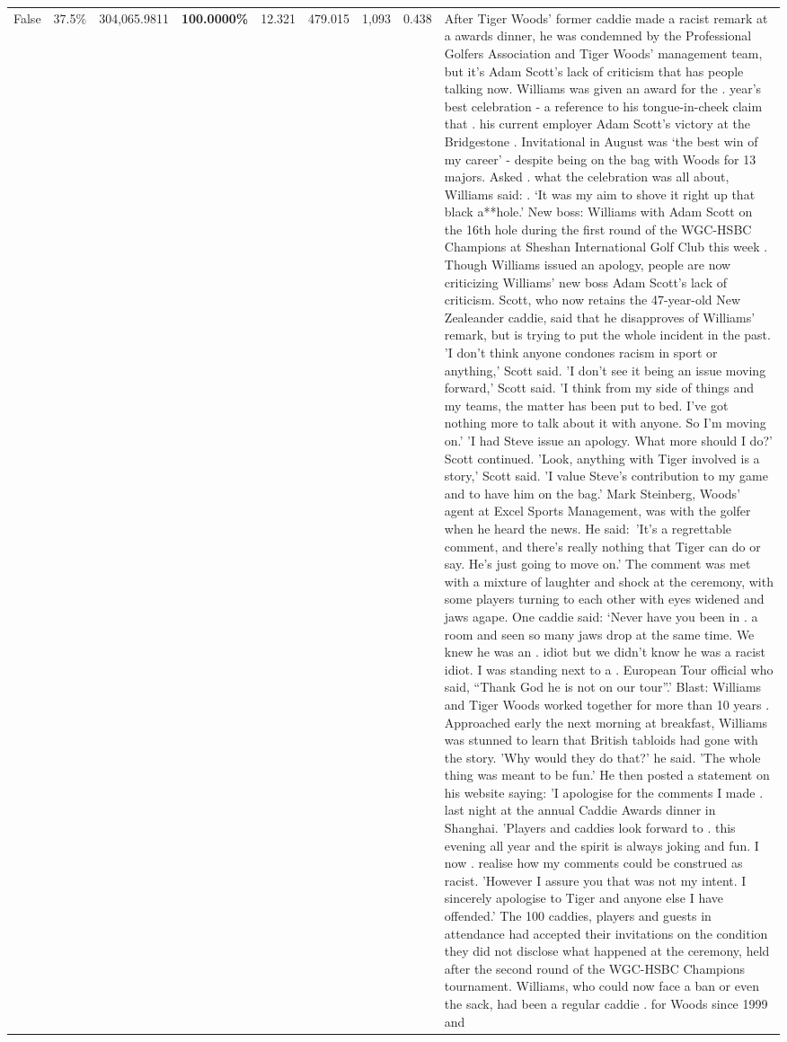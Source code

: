\begin{table}[H]
\begin{tabular}{lllrlllll}
False & 37.5\% & 304,065.9811 & \bfseries \color{red} 100.0000\% & 12.321 & 479.015 & 1,093 & 0.438 & After Tiger Woods' former caddie made a racist remark at a awards dinner, he was condemned by the Professional Golfers Association and Tiger Woods' management team, but it's Adam Scott's lack of criticism that has people talking now. Williams was given an award for the . year’s best celebration - a reference to his tongue-in-cheek claim that . his current employer Adam Scott’s victory at the Bridgestone . Invitational in August was ‘the best win of my career’ - despite being on the bag with Woods for 13 majors. Asked . what the celebration was all about, Williams said: . ‘It was my aim to shove it right up that black a**hole.’ New boss: Williams with Adam Scott  on the 16th hole during the first round of the WGC-HSBC Champions at Sheshan International Golf Club this week . Though Williams issued an apology, people are now criticizing Williams' new boss Adam Scott's lack of criticism. Scott, who now retains the 47-year-old New Zealeander caddie, said that he disapproves of Williams' remark, but is trying to put the whole incident in the past. 'I don't think anyone condones racism in sport or anything,' Scott said. 'I don't see it being an issue moving forward,' Scott said. 'I think from my side of things and my teams, the matter has been put to bed. I've got nothing more to talk about it with anyone. So I'm moving on.' 'I had Steve issue an apology. What more should I do?' Scott continued. 'Look, anything with Tiger involved is a story,' Scott said. 'I value Steve's contribution to my game and to have him on the bag.' Mark Steinberg, Woods' agent at Excel Sports Management, was with the golfer when he heard the news. He said: 'It's a regrettable comment, and there's really nothing that Tiger can do or say. He's just going to move on.' The comment was met with a mixture of laughter and shock at the ceremony, with some players turning to each other with eyes widened and jaws agape. One caddie said: ‘Never have you been in . a room and seen so many jaws drop at the same time. We knew he was an . idiot but we didn’t know he was a racist idiot. I was standing next to a . European Tour official who said, “Thank God he is not on our tour”.’ Blast: Williams and Tiger Woods worked together for more than 10 years . Approached early the next morning at breakfast, Williams was stunned to learn that British tabloids had gone with the story. 'Why would they do that?' he said. 'The whole thing was meant to be fun.' He then posted a statement on his website saying: 'I apologise for the comments I made . last night at the annual Caddie Awards dinner in Shanghai. 'Players and caddies look forward to . this evening all year and the spirit is always joking and fun. I now . realise how my comments could be construed as racist. 'However I assure you that was not my intent. I sincerely apologise to Tiger and anyone else I have offended.' The 100 caddies, players and guests in attendance had accepted their invitations on the condition they did not disclose what happened at the ceremony, held after the second round of the WGC-HSBC Champions tournament. Williams, who could now face a ban or even the sack, had been a regular caddie . for Woods since 1999 and 
\end{tabular}
\end{table}
